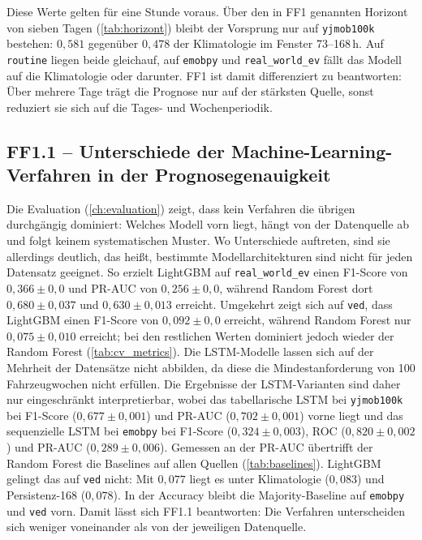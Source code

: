 Diese Werte gelten für eine Stunde voraus. Über den in FF1 genannten Horizont von sieben Tagen (\cref{tab:horizont}) bleibt der Vorsprung nur auf \texttt{yjmob100k} bestehen: $0,581$ gegenüber $0,478$ der Klimatologie im Fenster 73--168\,h. Auf \texttt{routine} liegen beide gleichauf, auf \texttt{emobpy} und \texttt{real\_world\_ev} fällt das Modell auf die Klimatologie oder darunter. FF1 ist damit differenziert zu beantworten: Über mehrere Tage trägt die Prognose nur auf der stärksten Quelle, sonst reduziert sie sich auf die Tages- und Wochenperiodik.


\subsection{FF1.1 -- Unterschiede der Machine-Learning-Verfahren in der Prognosegenauigkeit}

Die Evaluation (\cref{ch:evaluation}) zeigt, dass kein Verfahren die übrigen durchgängig dominiert: Welches Modell vorn liegt, hängt von der Datenquelle ab und folgt keinem systematischen Muster. Wo Unterschiede auftreten, sind sie allerdings deutlich, das heißt, bestimmte Modellarchitekturen sind nicht für jeden Datensatz geeignet. So erzielt LightGBM auf \texttt{real\_world\_ev} einen F1-Score von $0,366\pm0,0$ und PR-AUC von $0,256\pm0,0$, während Random Forest dort $0,680\pm0,037$ und $0,630\pm0,013$ erreicht. Umgekehrt zeigt sich auf \texttt{ved}, dass LightGBM einen F1-Score von $0,092\pm0,0$ erreicht, während Random Forest nur $0,075\pm0,010$ erreicht; bei den restlichen Werten dominiert jedoch wieder der Random Forest (\cref{tab:cv_metrics}). Die LSTM-Modelle lassen sich auf der Mehrheit der Datensätze nicht abbilden, da diese die Mindestanforderung von 100 Fahrzeugwochen nicht erfüllen. Die Ergebnisse der LSTM-Varianten sind daher nur eingeschränkt interpretierbar, wobei das tabellarische LSTM bei \texttt{yjmob100k} bei F1-Score ($0,677\pm0,001$) und PR-AUC ($0,702\pm0,001$) vorne liegt und das sequenzielle LSTM bei \texttt{emobpy} bei F1-Score ($0,324\pm0,003$), ROC ($0,820\pm0,002$) und PR-AUC ($0,289\pm0,006$). Gemessen an der PR-AUC übertrifft der Random Forest die Baselines auf allen Quellen (\cref{tab:baselines}). LightGBM gelingt das auf \texttt{ved} nicht: Mit $0,077$ liegt es unter Klimatologie ($0,083$) und Persistenz-168 ($0,078$). In der Accuracy bleibt die Majority-Baseline auf \texttt{emobpy} und \texttt{ved} vorn. Damit lässt sich FF1.1 beantworten: Die Verfahren unterscheiden sich weniger voneinander als von der jeweiligen Datenquelle.


